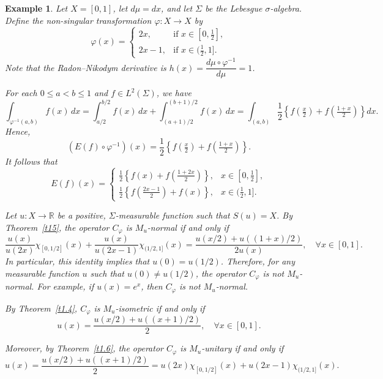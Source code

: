 \documentclass{amsart}
\newtheorem{exam}[thm]{Example}
\theoremstyle{definition}\newtheorem{defn}[thm]{Definition}
\theoremstyle{remark}
\numberwithin{equation}{section}
\begin{document}
\begin{exam}
Let \( X = [0, 1] \), let \( d\mu = dx \), and let \( \Sigma \) be the Lebesgue \(\sigma\)-algebra. Define the non-singular transformation \( \varphi : X \to X \) by
\[
\varphi(x) =
\begin{cases}
2x, & \text{if } x \in [0, \tfrac{1}{2}], \\
2x - 1, & \text{if } x \in (\tfrac{1}{2}, 1].
\end{cases}
\]
Note that the Radon–Nikodym derivative is \( h(x) = \dfrac{d\mu \circ \varphi^{-1}}{d\mu} = 1 \).

For each \( 0 \leq a < b \leq 1 \) and \( f \in L^2(\Sigma) \), we have
\[
\int_{\varphi^{-1}(a,b)} f(x) \, dx = \int_{a/2}^{b/2} f(x) \, dx + \int_{(a+1)/2}^{(b+1)/2} f(x) \, dx = \int_{(a,b)} \frac{1}{2} \left\{ f\left(\tfrac{x}{2}\right) + f\left(\tfrac{1+x}{2}\right) \right\} dx.
\]
Hence,
\[
(E(f) \circ \varphi^{-1})(x) = \frac{1}{2} \left\{ f\left( \tfrac{x}{2} \right) + f\left( \tfrac{1+x}{2} \right) \right\}.
\]
It follows that
\[
E(f)(x) =
\begin{cases}
\frac{1}{2} \left\{ f(x) + f\left( \frac{1 + 2x}{2} \right) \right\}, & x \in [0, \tfrac{1}{2}], \\
\frac{1}{2} \left\{ f\left( \frac{2x - 1}{2} \right) + f(x) \right\}, & x \in (\tfrac{1}{2}, 1].
\end{cases}
\]

Let \( u : X \to \mathbb{R} \) be a positive, \( \Sigma \)-measurable function such that \( S(u) = X \). By Theorem~\ref{t15}, the operator \( C_{\varphi} \) is \( M_u \)-normal if and only if
\[
\frac{u(x)}{u(2x)} \chi_{[0,1/2]}(x) + \frac{u(x)}{u(2x - 1)} \chi_{(1/2,1]}(x) = \frac{u(x/2) + u((1+x)/2)}{2u(x)}, \quad \forall x \in [0,1].
\]
In particular, this identity implies that \( u(0) = u(1/2) \). Therefore, for any measurable function \( u \) such that \( u(0) \neq u(1/2) \), the operator \( C_{\varphi} \) is not \( M_u \)-normal. For example, if \( u(x) = e^x \), then \( C_{\varphi} \) is not \( M_u \)-normal.

\medskip

By Theorem~\ref{t1.4}, \( C_{\varphi} \) is \( M_u \)-isometric if and only if
\[
u(x) = \frac{u(x/2) + u((x+1)/2)}{2}, \quad \forall x \in [0,1].
\]

\medskip

Moreover, by Theorem~\ref{t1.6}, the operator \( C_{\varphi} \) is \( M_u \)-unitary if and only if
\[
u(x) = \frac{u(x/2) + u((x+1)/2)}{2} = u(2x)\chi_{[0,1/2]}(x) + u(2x - 1)\chi_{(1/2,1]}(x).
\]
\end{exam}
\end{document}
